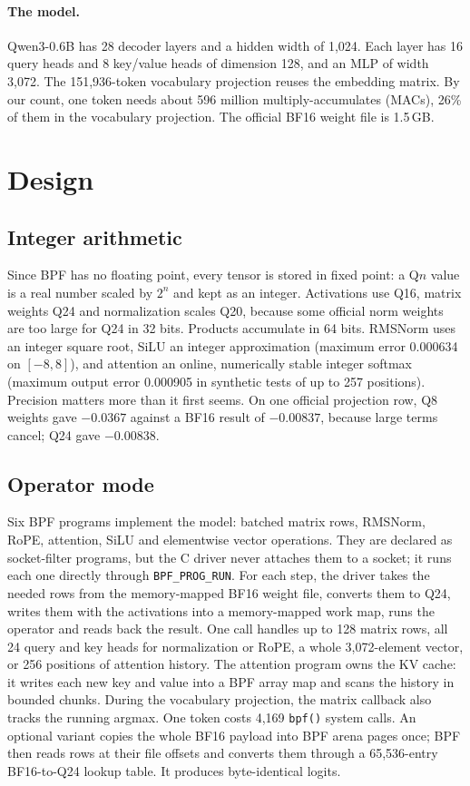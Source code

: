 \documentclass[sigconf,nonacm]{acmart}
\begin{document}
\paragraph{The model.} Qwen3-0.6B has 28 decoder layers and a hidden width of
1,024. Each layer has 16 query heads and 8 key/value heads of dimension 128,
and an MLP of width 3,072. The 151,936-token vocabulary projection reuses the
embedding matrix. By our count, one token needs about 596 million
multiply-accumulates (MACs), 26\% of them in the vocabulary projection. The
official BF16 weight file is 1.5\,GB.

\section{Design}
\label{sec:design}

\subsection{Integer arithmetic}

Since BPF has no floating point, every tensor is stored in fixed point: a
Q$n$ value is a real number scaled by $2^n$ and kept as an integer.
Activations use Q16, matrix weights Q24 and normalization scales Q20,
because some official norm weights are too large for Q24 in 32 bits.
Products accumulate in 64 bits. RMSNorm uses an integer square root, SiLU an
integer approximation (maximum error 0.000634 on $[-8,8]$), and attention an
online, numerically stable integer softmax (maximum output error 0.000905 in
synthetic tests of up to 257 positions). Precision matters more than it first
seems. On one official projection row, Q8 weights gave $-0.0367$ against a
BF16 result of $-0.00837$, because large terms cancel; Q24 gave $-0.00838$.

\subsection{Operator mode}

Six BPF programs implement the model: batched matrix rows, RMSNorm, RoPE,
attention, SiLU and elementwise vector operations. They are declared as
socket-filter programs, but the C driver never attaches them to a socket; it
runs each one directly through \texttt{BPF\_PROG\_RUN}. For each step, the
driver takes the needed rows from the memory-mapped BF16 weight file,
converts them to Q24, writes them with the activations into a memory-mapped
work map, runs the operator and reads back the result. One call handles up to
128 matrix rows, all 24 query and key heads for normalization or RoPE, a
whole 3,072-element vector, or 256 positions of attention history. The
attention program owns the KV cache: it writes each new key and value into a
BPF array map and scans the history in bounded chunks. During the vocabulary
projection, the matrix callback also tracks the running argmax. One token
costs 4,169 \texttt{bpf()} system calls. An optional variant copies the whole
BF16 payload into BPF arena pages once; BPF then reads rows at their file
offsets and converts them through a 65,536-entry BF16-to-Q24 lookup table.
It produces byte-identical logits.
\end{document}
